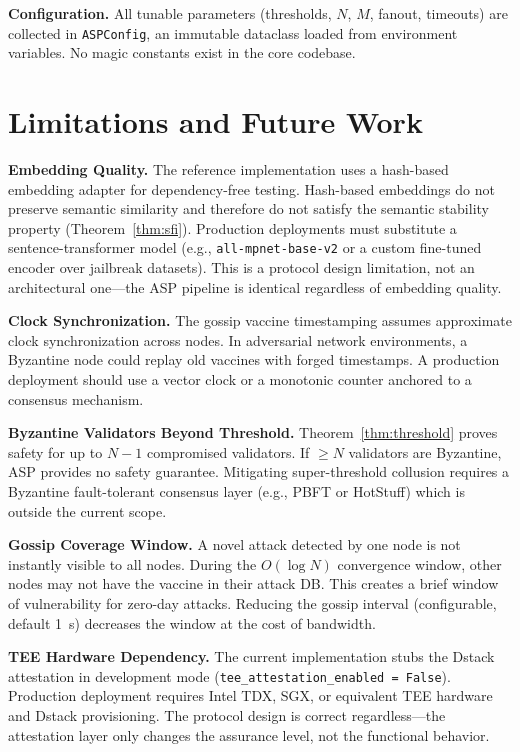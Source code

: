 \documentclass[sigconf,natbib=false]{acmart}
\begin{document}
\textbf{Configuration.}
All tunable parameters (thresholds, $N$, $M$, fanout, timeouts) are
collected in \texttt{ASPConfig}, an immutable dataclass loaded from
environment variables. No magic constants exist in the core codebase.

\section{Limitations and Future Work}
\label{sec:limitations}

\textbf{Embedding Quality.}
The reference implementation uses a hash-based embedding adapter for
dependency-free testing. Hash-based embeddings do not preserve semantic
similarity and therefore do not satisfy the semantic stability property
(Theorem~\ref{thm:sfi}). Production deployments must substitute a
sentence-transformer model (e.g., \texttt{all-mpnet-base-v2} or a
custom fine-tuned encoder over jailbreak datasets). This is a protocol
design limitation, not an architectural one—the ASP pipeline is
identical regardless of embedding quality.

\textbf{Clock Synchronization.}
The gossip vaccine timestamping assumes approximate clock synchronization
across nodes. In adversarial network environments, a Byzantine node could
replay old vaccines with forged timestamps. A production deployment should
use a vector clock or a monotonic counter anchored to a consensus mechanism.

\textbf{Byzantine Validators Beyond Threshold.}
Theorem~\ref{thm:threshold} proves safety for up to $N-1$ compromised
validators. If $\geq N$ validators are Byzantine, ASP provides no safety
guarantee. Mitigating super-threshold collusion requires a
Byzantine fault-tolerant consensus layer (e.g., PBFT or HotStuff) which
is outside the current scope.

\textbf{Gossip Coverage Window.}
A novel attack detected by one node is not instantly visible to all nodes.
During the $O(\log N)$ convergence window, other nodes may not have the
vaccine in their attack DB. This creates a brief window of vulnerability
for zero-day attacks. Reducing the gossip interval (configurable, default
1~s) decreases the window at the cost of bandwidth.

\textbf{TEE Hardware Dependency.}
The current implementation stubs the Dstack attestation in development
mode (\texttt{tee\_attestation\_enabled = False}). Production deployment
requires Intel TDX, SGX, or equivalent TEE hardware and Dstack provisioning.
The protocol design is correct regardless—the attestation layer only
changes the assurance level, not the functional behavior.
\end{document}
